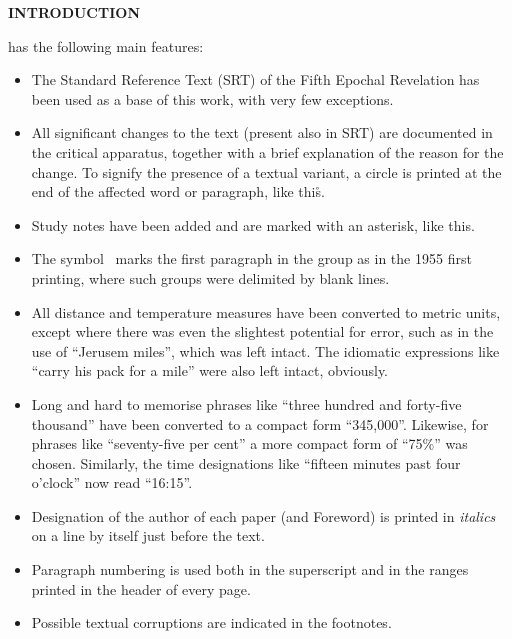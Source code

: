 \newpage
\thispagestyle{empty}

\makeatletter
{}%
\makeatother

\begin{center}
\Large{}\bfseries
INTRODUCTION
\end{center}


 has the following main features:

\begin{itemize}
\item The Standard Reference Text (SRT) of the Fifth Epochal Revelation has been used as a base of this work, with very few exceptions.
\item All significant changes to the text (present also in SRT) are documented in the critical apparatus, together with a brief explanation of the reason for the change. To signify the presence of a textual variant, a circle is printed at the end of the affected word or paragraph, like this\r{}.
\item Study notes have been added and are marked with an asterisk, like this\ts{*}.
\item The symbol \pc\ marks the first paragraph in the group as in the 1955 first printing, where such groups were delimited by blank lines.
\item All distance and temperature measures have been converted to metric units, except where there was even the slightest potential for error, such as in the use of ``Jerusem miles'', which was left intact. The idiomatic expressions like ``carry his pack for a mile'' were also left intact, obviously.
\item Long and hard to memorise phrases like ``three hundred and forty\hyp{}five thousand'' have been converted to a compact form ``345,000''. Likewise, for phrases like ``seventy\hyp{}five per cent'' a more compact form of ``75\%'' was chosen. Similarly, the time designations like ``fifteen minutes past four o’clock'' now read ``16:15''.
\item Designation of the author of each paper (and Foreword) is printed in \textit{italics} on a line by itself just before the text.
\item Paragraph numbering is used both in the superscript and in the ranges printed in the head\-er of every page.
\item Possible textual corruptions are indicated in the footnotes.
\end{itemize}

